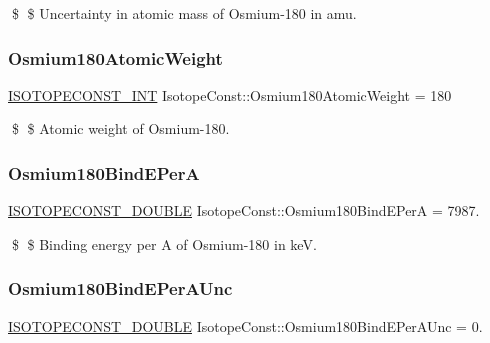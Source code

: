\$ \$ Uncertainty in atomic mass of Osmium-\/180 in amu. \mbox{\label{group___isotope_const-_osmium-_os180_ga3be5220b15f557687b3f55e152dd5d87}} 
\subsubsection{\texorpdfstring{Osmium180\+Atomic\+Weight}{Osmium180AtomicWeight}}
{\footnotesize\ttfamily \mbox{\hyperlink{group___isotope_const-_macros_ga5f18360b3e99483a35c32d789e62621c}{I\+S\+O\+T\+O\+P\+E\+C\+O\+N\+S\+T\+\_\+\+I\+NT}} Isotope\+Const\+::\+Osmium180\+Atomic\+Weight = 180}

\$ \$ Atomic weight of Osmium-\/180. \mbox{\label{group___isotope_const-_osmium-_os180_ga0b1144987e822455d34d60739719c0f2}} 
\subsubsection{\texorpdfstring{Osmium180\+Bind\+E\+PerA}{Osmium180BindEPerA}}
{\footnotesize\ttfamily \mbox{\hyperlink{group___isotope_const-_macros_ga8f45a7272ce02c0b4c65c44636ed719a}{I\+S\+O\+T\+O\+P\+E\+C\+O\+N\+S\+T\+\_\+\+D\+O\+U\+B\+LE}} Isotope\+Const\+::\+Osmium180\+Bind\+E\+PerA = 7987.}

\$ \$ Binding energy per A of Osmium-\/180 in keV. \mbox{\label{group___isotope_const-_osmium-_os180_ga4effea11e3b00d477d958121729c6235}} 
\subsubsection{\texorpdfstring{Osmium180\+Bind\+E\+Per\+A\+Unc}{Osmium180BindEPerAUnc}}
{\footnotesize\ttfamily \mbox{\hyperlink{group___isotope_const-_macros_ga8f45a7272ce02c0b4c65c44636ed719a}{I\+S\+O\+T\+O\+P\+E\+C\+O\+N\+S\+T\+\_\+\+D\+O\+U\+B\+LE}} Isotope\+Const\+::\+Osmium180\+Bind\+E\+Per\+A\+Unc = 0.}

